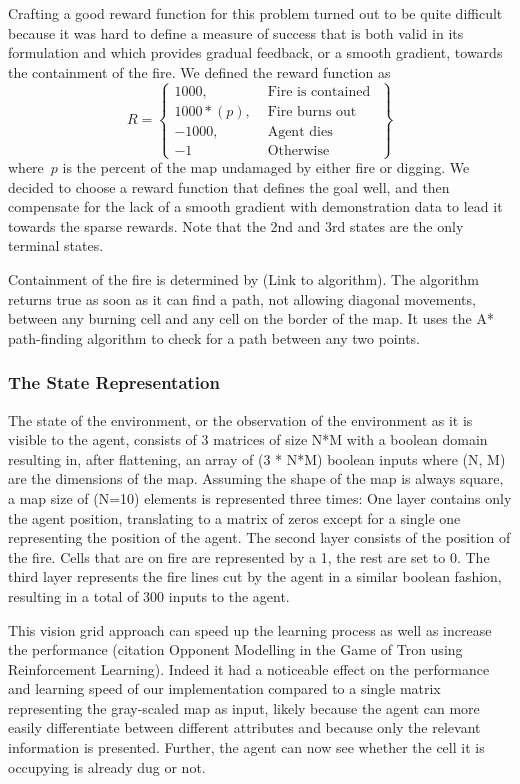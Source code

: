 Crafting a good reward function for this problem turned out to be quite difficult because it was hard to define a measure of success that is both valid in its formulation and which provides gradual feedback, or a smooth gradient, towards the containment of the fire. We defined the reward function as
\[
R = \left\{\begin{array}{lr}
    1000, & \text{ Fire is contained }\\
    1000 * (p), & \text{ Fire burns out }\\
    -1000, & \text{ Agent dies }\\
    -1 & \text{ Otherwise }

    \end{array}\right\}
\]
where~$p$ is the percent of the map undamaged by either fire or digging. We decided to choose a reward function that defines the goal well, and then compensate for the lack of a smooth gradient with demonstration data to lead it towards the sparse rewards. Note that the 2nd and 3rd states are the only terminal states.

Containment of the fire is determined by (Link to algorithm). The algorithm returns true as soon as it can find a path, not allowing diagonal movements, between any burning cell and any cell on the border of the map. It uses the A* path-finding algorithm to check for a path between any two points.



\subsubsection{The State Representation}\label{sec:state_rep}
The state of the environment, or the observation of the environment as it is visible to the agent, consists of 3 matrices of size N*M with a boolean domain resulting in, after flattening, an array of (3 * N*M) boolean inputs where (N, M) are the dimensions of the map. Assuming the shape of the map is always square, a map size of (N=10) elements is represented three times: One layer contains only the agent position, translating to a matrix of zeros except for a single one representing the position of the agent. The second layer consists of the position of the fire. Cells that are on fire are represented by a 1, the rest are set to 0. The third layer represents the fire lines cut by the agent in a similar boolean fashion, resulting in a total of 300 inputs to the agent.

This vision grid approach can speed up the learning process as well as increase the performance (citation Opponent Modelling in the Game of Tron using Reinforcement Learning). Indeed it had a noticeable effect on the performance and learning speed of our implementation compared to a single matrix representing the gray-scaled map as input, likely because the agent can more easily differentiate between different attributes and because only the relevant information is presented. Further, the agent can now see whether the cell it is occupying is already dug or not.

